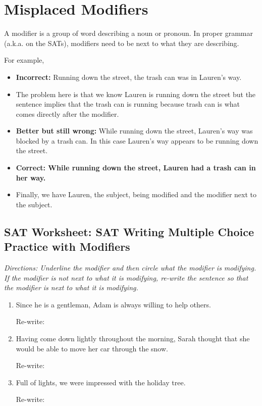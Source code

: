 \section{Misplaced Modifiers}
A modifier is a group of word describing a noun or pronoun. In proper grammar (a.k.a. on the SATs), modifiers need to be next to what they are describing.


For example,

\bigskip
\begin{itemize}
\item{\textbf{Incorrect:} Running down the street, the trash can was in Lauren's way.}
\item{The problem here is that we know Lauren is running down the street but the sentence implies that the trash can is running because trash can is what comes directly after the modifier.}
\item{\textbf{Better but still wrong:} While running down the street, Lauren's way was blocked by a trash can. In this case Lauren's way appears to be running down the street.}
\item{\textbf{Correct: While running down the street, Lauren had a trash can in her way.}}
\item{Finally, we have Lauren, the subject, being modified and the modifier next to the subject.}
\end{itemize} 

\vfill
\subsection{\sloppy SAT Worksheet: SAT Writing Multiple Choice Practice with Modifiers}
\textit{Directions: Underline the modifier and then circle what the modifier is modifying. If the modifier is not next to what it is modifying, re-write the sentence so that the modifier is next to what it is modifying.}

\bigskip
\begin{enumerate}
\item{Since he is a gentleman, Adam is always willing to help others.}

Re-write: \hrulefill

\bigskip
\hrulefill

\vfill\item{Having come down lightly throughout the morning, Sarah thought that she would be able to move her car through the snow.}

Re-write: \hrulefill

\bigskip
\hrulefill

\vfill\item{Full of lights, we were impressed with the holiday tree.}

Re-write: \hrulefill

\bigskip
\hrulefill

\end{enumerate}

